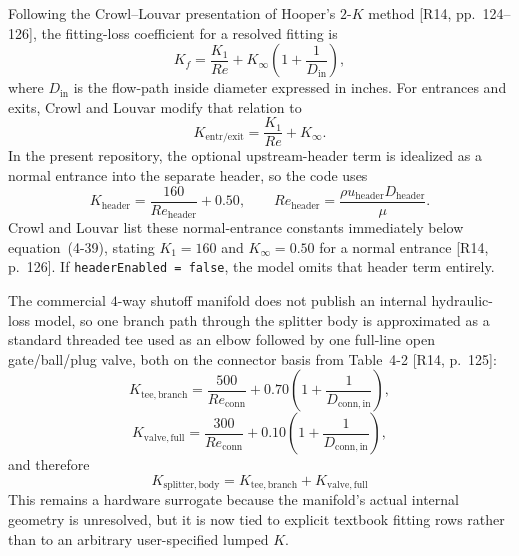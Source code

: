 \documentclass[11pt]{article}
\newcommand{\code}[1]{\nolinkurl{#1}}
\begin{document}
Following the Crowl--Louvar presentation of Hooper's \(2\)-\(K\) method [R14, pp.~124--126], the fitting-loss coefficient for a resolved fitting is
\begin{equation}
\label{eq:hooper_2k_fitting}
K_f=\frac{K_1}{Re}+K_\infty\!\left(1+\frac{1}{D_{\mathrm{in}}}\right),
\end{equation}
where \(D_{\mathrm{in}}\) is the flow-path inside diameter expressed in inches. For entrances and exits, Crowl and Louvar modify that relation to
\begin{equation}
\label{eq:hooper_2k_entrance_exit}
K_{\mathrm{entr/exit}}=\frac{K_1}{Re}+K_\infty.
\end{equation}
In the present repository, the optional upstream-header term is idealized as a normal entrance into the separate header, so the code uses
\begin{equation}
\label{eq:header_surrogate_k}
K_{\mathrm{header}}=\frac{160}{Re_{\mathrm{header}}}+0.50,
\qquad
Re_{\mathrm{header}}=\frac{\rho u_{\mathrm{header}}D_{\mathrm{header}}}{\mu}.
\end{equation}
Crowl and Louvar list these normal-entrance constants immediately below equation~(4-39), stating \(K_1=160\) and \(K_\infty=0.50\) for a normal entrance [R14, p.~126].
If \code{headerEnabled = false}, the model omits that header term entirely.

The commercial \(4\)-way shutoff manifold does not publish an internal hydraulic-loss model, so one branch path through the splitter body is approximated as a standard threaded tee used as an elbow followed by one full-line open gate/ball/plug valve, both on the connector basis from Table~4-2 [R14, p.~125]:
\begin{equation}
\label{eq:splitter_tee_surrogate_k}
K_{\mathrm{tee,branch}}=
\frac{500}{Re_{\mathrm{conn}}}
+0.70\!\left(1+\frac{1}{D_{\mathrm{conn,in}}}\right),
\end{equation}
\begin{equation}
\label{eq:splitter_valve_surrogate_k}
K_{\mathrm{valve,full}}=
\frac{300}{Re_{\mathrm{conn}}}
+0.10\!\left(1+\frac{1}{D_{\mathrm{conn,in}}}\right),
\end{equation}
and therefore
\begin{equation}
\label{eq:splitter_body_surrogate_k}
K_{\mathrm{splitter,body}}=
K_{\mathrm{tee,branch}}+K_{\mathrm{valve,full}}
\end{equation}
This remains a hardware surrogate because the manifold's actual internal geometry is unresolved, but it is now tied to explicit textbook fitting rows rather than to an arbitrary user-specified lumped \(K\).
\end{document}
